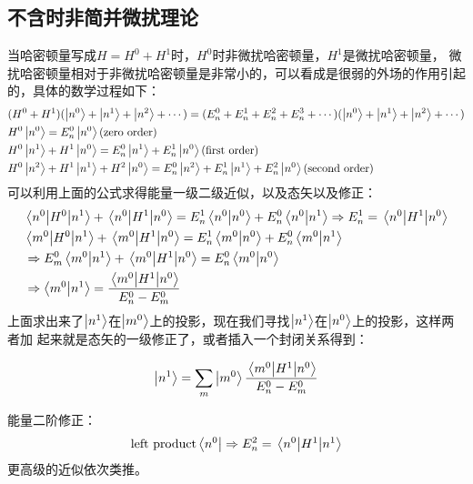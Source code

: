 \documentclass[UTF8]{article}
\numberwithin{equation}{section}
\begin{document}
\subsection{不含时非简并微扰理论}
当哈密顿量写成$H=H^0+H^1$时，$H^0$时非微扰哈密顿量，$H^1$是微扰哈密顿量，
微扰哈密顿量相对于非微扰哈密顿量是非常小的，可以看成是很弱的外场的作用引起
的，具体的数学过程如下：
\begin{align*}
     & (H^0+H^1)(\ket{n^0}+\ket{n^1}+\ket{n^2}+\cdots)=(E_n^0+E_n^1+E_n^2+E_n^3+\cdots)
    (\ket{n^0}+\ket{n^1}+\ket{n^2}+\cdots)                                              \\&H^0\ket{n^0}=E_n^0\ket{n^0}
    \text{(zero order)}                                                                 \\&H^0\ket{n^1}+H^1\ket{n^0}=E_n^0\ket{n^1}+E_n^1\ket{n^0}\text
    {(first order)}                                                                     \\&H^0\ket{n^2}+H^1\ket{n^1}+H^2\ket{n^0}=E_n^0\ket{n^2}+E_n^1\ket{n^1}
    +E_n^2\ket{n^0}\text{(second order)}
\end{align*}
可以利用上面的公式求得能量一级二级近似，以及态矢以及修正：
\begin{align*}
     & \mel{n^0}{H^0}{n^1}+\mel{n^0}{H^1}{n^0}=E_n^1\braket{n^0}{n^0}+E_n^0\braket{n^0}{n^1}
    \Rightarrow E_n^1=\mel{n^0}{H^1}{n^0}                                                    \\
     & \mel{m^0}{H^0}{n^1}+\mel{m^0}{H^1}{n^0}=E_n^1\braket{m^0}{n^0}+E_n^0\braket{m^0}{n^1} \\
     & \Rightarrow E_m^0\braket{m^0}{n^1}+\mel{m^0}{H^1}{n^0}=E_n^0\braket{m^0}{n^0}         \\
     & \Rightarrow \braket{m^0}{n^1}=\frac{\mel{m^0}{H^1}{n^0}}{E_n^0-E_m^0}
\end{align*}
上面求出来了$\ket{n^1}$在$\ket{m^0}$上的投影，现在我们寻找$\ket{n^1}$在$\ket{n^0}$上的投影，这样两者加
起来就是态矢的一级修正了，或者插入一个封闭关系得到：
\begin{tcolorbox}[colframe=red]
    $$\ket{n^1}=\sum_m \ket{m^0}\frac{\mel{m^0}{H^1}{n^0}}{E_n^0-E_m^0}$$
\end{tcolorbox}

能量二阶修正：
\begin{align*}
    \text{left product} \bra{n^0}\Rightarrow E_n^2=\mel{n^0}{H^1}{n^1}
\end{align*}
更高级的近似依次类推。
\end{document}
